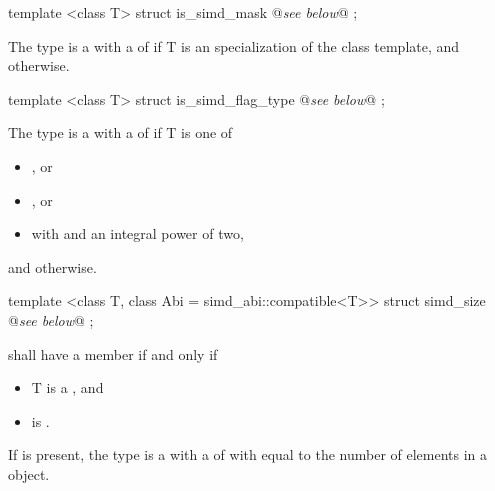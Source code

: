 \begin{itemdecl}
template <class T> struct is_simd_mask { @\emph{see below}@ };
\end{itemdecl}
\begin{itemdescr}
  \pnum The type  is a \UnaryTypeTrait with a \BaseCharacteristic of  if \type T is an specialization of the \mask class template, and  otherwise.

  \pnum{}
\end{itemdescr}

\begin{itemdecl}
template <class T> struct is_simd_flag_type { @\emph{see below}@ };
\end{itemdecl}\label{is_simd_flag_type}
\begin{itemdescr}
  \pnum The type  is a \UnaryTypeTrait with a \BaseCharacteristic of  if \type T is one of
  \begin{itemize}
    \item {}, or
    \item {}, or
    \item {} with  and  an integral power of two,
  \end{itemize}
  and  otherwise.

  \pnum{}
\end{itemdescr}

\begin{itemdecl}
template <class T, class Abi = simd_abi::compatible<T>> struct simd_size { @\emph{see below}@ };
\end{itemdecl}
\begin{itemdescr}
  \pnum\label{simd_size}%
   shall have a member  if and only if
  \begin{itemize}
    \item \type T is a \realArithmeticType, and
    \item {} is \true.
  \end{itemize}

  \pnum
  If  is present, the type  is a \BinaryTypeTrait with a \BaseCharacteristic of  with  equal to the number of elements in a \simd[<T, Abi>] object.

  \pnum{}

\end{itemdescr}

